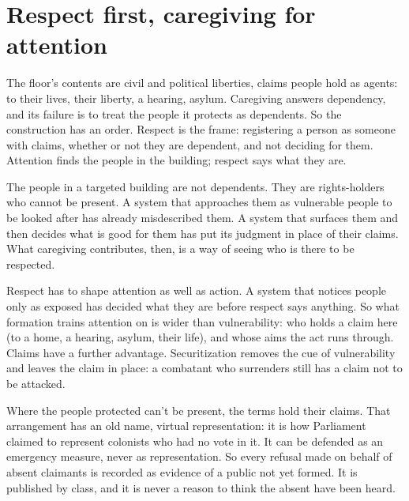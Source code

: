 \section{Respect first, caregiving for attention}
\label{sec:20.4}
The floor's contents are civil and political liberties, claims people hold as agents: to their lives, their liberty, a hearing, asylum. Caregiving answers dependency, and its failure is to treat the people it protects as dependents. So the construction has an order. Respect is the frame: registering a person as someone with claims, whether or not they are dependent, and not deciding for them.
Attention finds the people in the building; respect says what they are.

The people in a targeted building are not dependents. They are rights-holders who cannot be present. A system that approaches them as vulnerable people to be looked after has already misdescribed them. A system that surfaces them and then decides what is good for them has put its judgment in place of their claims. What caregiving contributes, then, is a way of seeing who is there to be respected.

Respect has to shape attention as well as action. A system that notices people only as exposed has decided what they are before respect says anything.
So what formation trains attention on is wider than vulnerability: who holds a claim here (to a home, a hearing, asylum, their life), and whose aims the act runs through.
Claims have a further advantage. Securitization removes the cue of vulnerability and leaves the claim in place: a combatant who surrenders still has a claim not to be attacked.

Where the people protected can't be present, the terms hold their claims. That arrangement has an old name, virtual representation: it is how Parliament claimed to represent colonists who had no vote in it. It can be defended as an emergency measure, never as representation. So every refusal made on behalf of absent claimants is recorded as evidence of a public not yet formed. It is published by class, and it is never a reason to think the absent have been heard.
